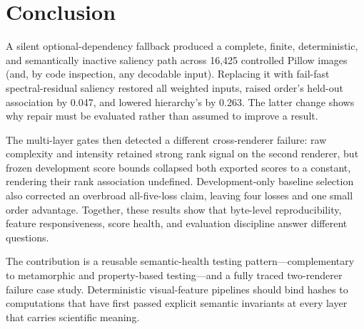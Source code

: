 \section{Conclusion}
\label{sec:conclusion}

A silent optional-dependency fallback produced a complete, finite, deterministic, and semantically inactive saliency path across 16,425 controlled Pillow images (and, by code inspection, any decodable input). Replacing it with fail-fast spectral-residual saliency restored all weighted inputs, raised order's held-out association by 0.047, and lowered hierarchy's by 0.263. The latter change shows why repair must be evaluated rather than assumed to improve a result.

The multi-layer gates then detected a different cross-renderer failure: raw complexity and intensity retained strong rank signal on the second renderer, but frozen development score bounds collapsed both exported scores to a constant, rendering their rank association undefined. Development-only baseline selection also corrected an overbroad all-five-loss claim, leaving four losses and one small order advantage. Together, these results show that byte-level reproducibility, feature responsiveness, score health, and evaluation discipline answer different questions.

The contribution is a reusable semantic-health testing pattern---complementary to metamorphic and property-based testing---and a fully traced two-renderer failure case study. Deterministic visual-feature pipelines should bind hashes to computations that have first passed explicit semantic invariants at every layer that carries scientific meaning.

